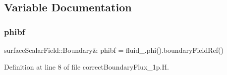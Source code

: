 \subsection{Variable Documentation}
\mbox{\label{correctBoundaryFlux__1p_8H_acafa946a65161db0a066a195f36b60cb}} 
\subsubsection{\texorpdfstring{phibf}{phibf}}
{\footnotesize\ttfamily surface\+Scalar\+Field\+::\+Boundary\& phibf = fluid\+\_\+.\+phi().boundary\+Field\+Ref()}



Definition at line 8 of file correct\+Boundary\+Flux\+\_\+1p.\+H.

